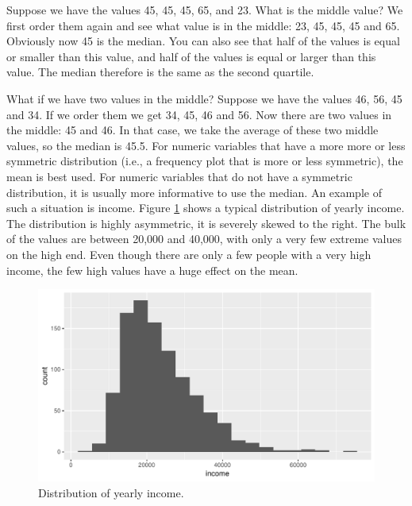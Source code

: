 \documentclass[]{report}\usepackage[]{graphicx}\usepackage[]{color}
\makeatletter
\def\maxwidth{ %
  \ifdim\Gin@nat@width>\linewidth
    \linewidth
  \else
    \Gin@nat@width
  \fi
}
\makeatother
\begin{document}
Suppose we have the values 45, 45, 45, 65, and 23. What is the middle value? We first order them again and see what value is in the middle: 23, 45, 45, 45 and 65. Obviously now 45 is the median. You can also see that half of the values is equal or smaller than this value, and half of the values is equal or larger than this value. The median therefore is the same as the second quartile.

What if we have two values in the middle? Suppose we have the values 46, 56, 45 and 34. If we order them we get 34, 45, 46 and 56. Now there are two values in the middle: 45 and 46. In that case, we take the average of these two middle values, so the median is 45.5. For numeric variables that have a more more or less symmetric distribution (i.e., a frequency plot that is more or less symmetric), the mean is best used. For numeric variables that do not have a symmetric distribution, it is usually more informative to use the median. An example of such a situation is income. Figure \ref{fig:median} shows a typical distribution of yearly income. The distribution is highly asymmetric, it is severely skewed to the right. The bulk of the values are between 20,000 and 40,000, with only a very few extreme values on the high end. Even though there are only a few people with a very high income, the few high values have a huge effect on the mean.

\begin{figure}

{\centering \includegraphics[width=\maxwidth]{figure/median-1} 

}

\caption[Distribution of yearly income]{Distribution of yearly income.}\label{fig:median}
\end{figure}
\end{document}
